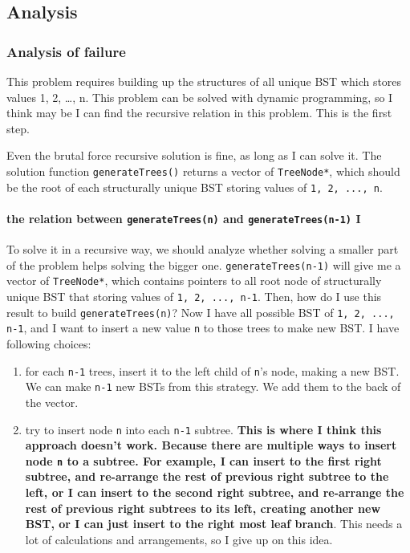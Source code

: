 \documentclass[12pt]{article}
\begin{document}
\subsection{Analysis}
\label{sec:org073df9e}
\subsubsection{Analysis of failure}
\label{sec:orgbf83c31}
This problem requires building up the structures of all unique BST which stores values 1, 2, \ldots{}, n. This problem can be solved with dynamic programming, so I think may be I can find the recursive relation in this problem. This is the first step.

Even the brutal force recursive solution is fine, as long as I can solve it. The solution function \texttt{generateTrees()} returns a vector of \texttt{TreeNode*}, which should be the root of each structurally unique BST storing values of \texttt{1, 2, ..., n}.
\paragraph{the relation between \texttt{generateTrees(n)} and \texttt{generateTrees(n-1)} I}
\label{sec:orgb29a0c5}

To solve it in a recursive way, we should analyze whether solving a smaller part of the problem helps solving the bigger one. \texttt{generateTrees(n-1)} will give me a vector of \texttt{TreeNode*}, which contains pointers to all root node of structurally unique BST that storing values of \texttt{1, 2, ..., n-1}. Then, how do I use this result to build \texttt{generateTrees(n)}? Now I have all possible BST of \texttt{1, 2, ..., n-1}, and I want to insert a new value \texttt{n} to those trees to make new BST. I have following choices:
\begin{enumerate}
\item for each \texttt{n-1} trees, insert it to the left child of \texttt{n}'s node, making a new BST. We can make \texttt{n-1} new BSTs from this strategy. We add them to the back of the vector.
\item try to insert node \texttt{n} into each \texttt{n-1} subtree. \textbf{This is where I think this approach doesn't work. Because there are multiple ways to insert node \texttt{n} to a subtree. For example, I can insert to the first right subtree, and re-arrange the rest of previous right subtree to the left, or I can insert to the second right subtree, and re-arrange the rest of previous right subtrees to its left, creating another new BST, or I can just insert to the right most leaf branch}. This needs a lot of calculations and arrangements, so I give up on this idea.
\end{enumerate}
\end{document}
